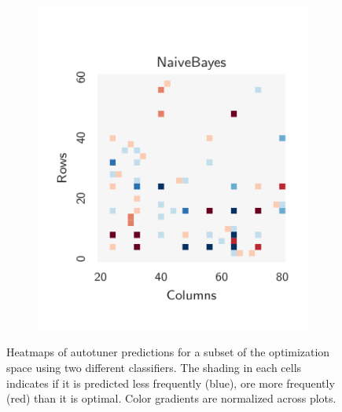 \documentclass[nonatbib,preprint,nocopyrightspace,9pt]{sigplanconf}
\begin{document}
\begin{figure}
\begin{subfigure}[t]{0.48\columnwidth}
\includegraphics[width=\columnwidth]{img/heatmap_2}
\vspace{-1.5em} %
\caption{}
\label{fig:class-hmaps-2}
\end{subfigure}
\caption{%
  Heatmaps of autotuner predictions for a subset of the optimization
  space using two different classifiers. The shading in each cells
  indicates if it is predicted less frequently (blue), ore more
  frequently (red) than it is optimal. Color gradients are normalized
  across plots.%
}
\label{fig:class-hmaps}
\end{figure}
\end{document}

